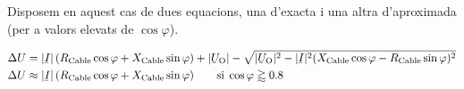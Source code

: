 Disposem en aquest cas de dues equacions, una d'exacta i una altra d'aproximada (per a valors elevats de $\cos \varphi$).

\begin{subequations}
\begin{align}
   \Delta U &= |\cmplx{I}| \,( R\ped{Cable} \cos \varphi + X\ped{Cable} \sin \varphi) + |\cmplx{U}\ped{O}| - \sqrt{|\cmplx{U}\ped{O}|^2 - |\cmplx{I}|^2 ( X\ped{Cable} \cos \varphi - R\ped{Cable} \sin \varphi )^2} \label{eq:cdt_trif_exact} \\
   \Delta U &\approx |\cmplx{I}| \,( R\ped{Cable} \cos \varphi + X\ped{Cable} \sin \varphi) \qquad \text{si} \; \cos \varphi \gtrapprox \num{0,8} \label{eq:cdt_trif_aprox}
\end{align}
\end{subequations}


